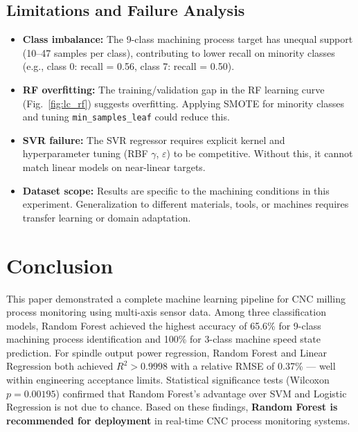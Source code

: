 \documentclass[conference]{IEEEtran}
\begin{document}
\subsection{Limitations and Failure Analysis}

\begin{itemize}
    \item \textbf{Class imbalance:} The 9-class machining process target has unequal
          support (10--47 samples per class), contributing to lower recall on
          minority classes (e.g., class 0: recall = 0.56, class 7: recall = 0.50).
    \item \textbf{RF overfitting:} The training/validation gap in the RF learning curve
          (Fig.~\ref{fig:lc_rf}) suggests overfitting. Applying SMOTE for minority
          classes and tuning \texttt{min\_samples\_leaf} could reduce this.
    \item \textbf{SVR failure:} The SVR regressor requires explicit kernel and
          hyperparameter tuning (RBF $\gamma$, $\varepsilon$) to be competitive.
          Without this, it cannot match linear models on near-linear targets.
    \item \textbf{Dataset scope:} Results are specific to the machining conditions
          in this experiment. Generalization to different materials, tools, or machines
          requires transfer learning or domain adaptation.
\end{itemize}

\section{Conclusion}
\label{sec:conclusion}

This paper demonstrated a complete machine learning pipeline for CNC milling process
monitoring using multi-axis sensor data. Among three classification models, Random
Forest achieved the highest accuracy of 65.6\% for 9-class machining process
identification and 100\% for 3-class machine speed state prediction. For spindle
output power regression, Random Forest and Linear Regression both achieved
$R^2 > 0.9998$ with a relative RMSE of 0.37\% — well within engineering acceptance
limits. Statistical significance tests (Wilcoxon $p = 0.00195$) confirmed that Random
Forest's advantage over SVM and Logistic Regression is not due to chance. Based on
these findings, \textbf{Random Forest is recommended for deployment} in real-time
CNC process monitoring systems.
\end{document}
